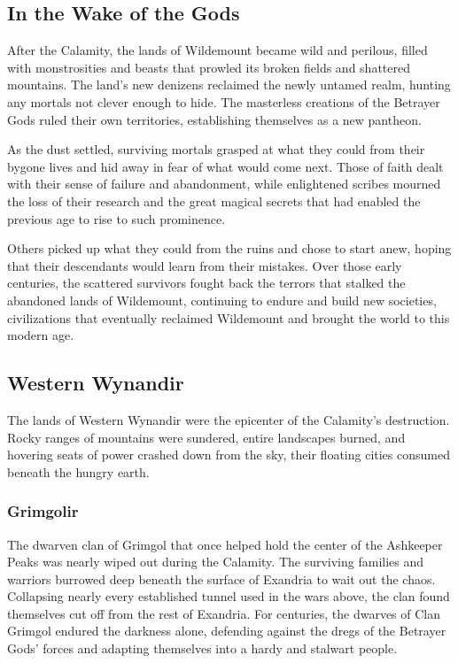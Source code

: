 \documentclass[10pt,a4paper,twoside,bg=print,twocolumn,openany,nodeprecatedcode]{dndbook}
\begin{document}
\subsection{In the Wake of the Gods}
After the Calamity, the lands of Wildemount became wild and perilous, filled with monstrosities and beasts that prowled its broken fields and shattered mountains. The land's new denizens reclaimed the newly untamed realm, hunting any mortals not clever enough to hide. The masterless creations of the Betrayer Gods ruled their own territories, establishing themselves as a new pantheon.

As the dust settled, surviving mortals grasped at what they could from their bygone lives and hid away in fear of what would come next. Those of faith dealt with their sense of failure and abandonment, while enlightened scribes mourned the loss of their research and the great magical secrets that had enabled the previous age to rise to such prominence.

Others picked up what they could from the ruins and chose to start anew, hoping that their descendants would learn from their mistakes. Over those early centuries, the scattered survivors fought back the terrors that stalked the abandoned lands of Wildemount, continuing to endure and build new societies, civilizations that eventually reclaimed Wildemount and brought the world to this modern age.

\subsection{Western Wynandir}
The lands of Western Wynandir were the epicenter of the Calamity's destruction. Rocky ranges of mountains were sundered, entire landscapes burned, and hovering seats of power crashed down from the sky, their floating cities consumed beneath the hungry earth.

\subsubsection{Grimgolir}
The dwarven clan of Grimgol that once helped hold the center of the Ashkeeper Peaks was nearly wiped out during the Calamity. The surviving families and warriors burrowed deep beneath the surface of Exandria to wait out the chaos. Collapsing nearly every established tunnel used in the wars above, the clan found themselves cut off from the rest of Exandria. For centuries, the dwarves of Clan Grimgol endured the darkness alone, defending against the dregs of the Betrayer Gods' forces and adapting themselves into a hardy and stalwart people.
\end{document}
